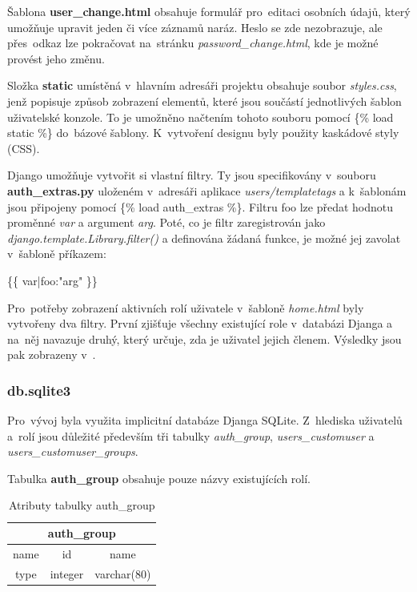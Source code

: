 Šablona \textbf{user\_change.html} obsahuje formulář pro~editaci
osobních údajů, který umožňuje upravit jeden či více záznamů
naráz. Heslo se zde nezobrazuje, ale přes~odkaz lze pokračovat 
na~stránku \textit{password\_change.html}, kde je možné provést jeho
změnu.

Složka \textbf{static} umístěná v~hlavním adresáři projektu obsahuje
soubor \textit{styles.css}, jenž popisuje způsob zobrazení elementů,
které jsou součástí jednotlivých šablon uživatelské konzole. To je
umožněno načtením tohoto souboru pomocí \textsf{\{\% load static \%\}}
do~bázové šablony. K~vytvoření designu byly použity kaskádové styly
(CSS).

Django umožňuje vytvořit si vlastní filtry. Ty jsou specifikovány 
v~souboru \textbf{auth\_extras.py} uloženém v~adresáři aplikace
\textit{users/templatetags} a k~šablonám jsou připojeny pomocí
\textsf{\{\% load auth\_extras \%\}}. Filtru \textsf{foo} lze předat
hodnotu proměnné \textit{var} a argument \textit{arg}. Poté, co je
filtr zaregistrován jako \linebreak \textit{django.template.Library.filter()} a
definována žádaná funkce, je možné jej zavolat v~šabloně příkazem:

\textsf{\{\{ var|foo:"arg" \}\}}

Pro~potřeby zobrazení aktivních rolí uživatele v~šabloně
\textit{home.html} byly vytvořeny dva filtry. První zjišťuje všechny
existující role v~databázi Djanga a na~něj navazuje druhý, který
určuje, zda je uživatel jejich členem. Výsledky jsou pak zobrazeny 
v~.

\subsubsection{db.sqlite3}

Pro~vývoj byla využita implicitní databáze Djanga SQLite. Z~hlediska
uživatelů a~rolí jsou důležité především tři tabulky
\textit{auth\_group}, \textit{users\_customuser} a\linebreak
\textit{users\_customuser\_groups}.

Tabulka \textbf{auth\_group} obsahuje pouze názvy existujících rolí.

\begin{table}[H]
\centering
\begin{tabular}{@{}|c|c|c|@{}}
\toprule
\multicolumn{3}{|c|}{auth\_group} \\ \midrule
name & id & name \\ \midrule
type & integer & varchar(80) \\ \bottomrule
\end{tabular}
\caption{Atributy tabulky auth\_group}
\label{tab:auth-group}
\end{table}

